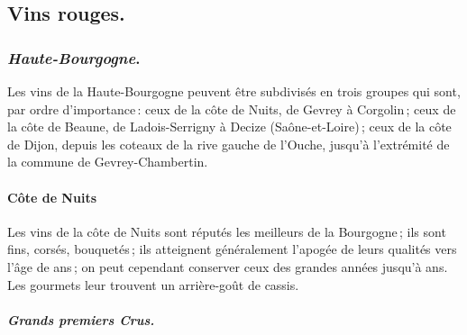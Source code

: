 \subsection*{\centering \small\sc Vins rouges.}

\subsubsection*{\centering \textit{ Haute-Bourgogne}.}

Les vins de la Haute-Bourgogne peuvent être subdivisés en trois groupes qui
sont, par ordre d'importance : ceux de la côte de Nuits, de Gevrey à Corgolin ;
ceux de la côte de Beaune, de Ladois-Serrigny à Decize (Saône-et-Loire) ; ceux
de la côte de Dijon, depuis les coteaux de la rive gauche de l'Ouche, jusqu'à
l'extrémité de la commune de Gevrey-Chambertin.

\paragraph{\normalsize\sc Côte de Nuits}

Les vins de la côte de Nuits sont réputés les meilleurs de la Bourgogne ; ils
sont fins, corsés, bouquetés ; ils atteignent généralement l'apogée de leurs
qualités vers l'âge de {\mmm} ans ; on peut cependant conserver ceux des
grandes années jusqu'à {\mmm} ans. Les gourmets leur trouvent un
arrière-goût de cassis.

\subparagraph{Grands premiers Crus.}

